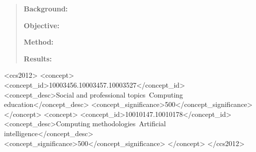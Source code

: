 \documentclass[sigconf]{acmart}
\begin{document}
\title[]{}



\author{Anon Author}
\orcid{}

\author{Anon Author}
\orcid{}

\author{Anon Author}
\orcid{}

\author{Anon Author}
\orcid{}



\renewcommand{\shortauthors}{}



\begin{abstract}

    \textbf{Background:} 

    \noindent\textbf{Objective:} 

    \noindent\textbf{Method:} 

    \noindent\textbf{Results:} 
\end{abstract}


\begin{CCSXML}
<ccs2012>
  <concept>
   <concept_id>10003456.10003457.10003527</concept_id>
   <concept_desc>Social and professional topics~Computing education</concept_desc>
   <concept_significance>500</concept_significance>
   </concept>
  <concept>
   <concept_id>10010147.10010178</concept_id>
   <concept_desc>Computing methodologies~Artificial intelligence</concept_desc>
   <concept_significance>500</concept_significance>
   </concept>
 </ccs2012>
\end{CCSXML}

\end{document}
